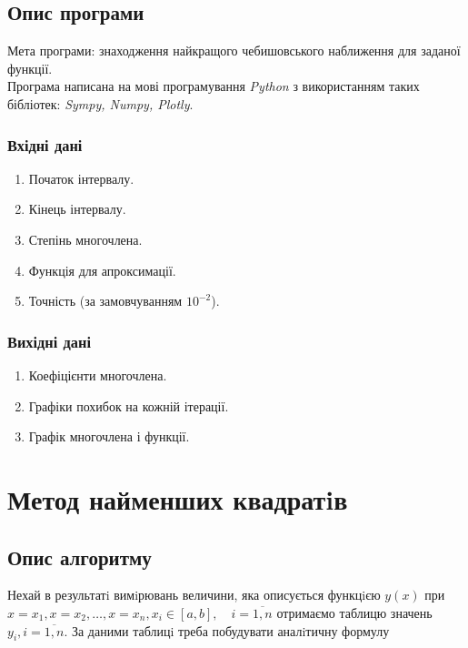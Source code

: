 \documentclass[ukrainian,14pt]{extarticle}
\begin{document}
\newpage

\subsection{Опис програми}

Мета програми: знаходження найкращого чебишовського наближення для заданої функції. \\
Програма написана на мові програмування \emph{Python} з використанням таких бібліотек: \emph{Sympy, Numpy, Plotly}.
\subsubsection{Вхідні дані}

\begin{enumerate}
\item Початок інтервалу.
\item Кінець інтервалу.
\item Степінь многочлена.
\item Функція для апроксимації.
\item Точність (за замовчуванням $10^{-2}$).
\end{enumerate}

\subsubsection{Вихідні дані}

\begin{enumerate}
\item Коефіцієнти многочлена.
\item Графіки похибок на кожній ітерації.
\item Графік многочлена і функції.

\end{enumerate}
\newpage

\section{Метод найменших квадратiв}
\subsection{Опис алгоритму}
Нехай в результатi вимiрювань величини, яка описується функцiєю
$y(x)$ при $x = x_1, x = x_2, \ldots , x = x_n, x_i \in [a, b], \quad i = \overline{1,n}$ отримаємо таблицю значень $y_i, i = \overline{1, n}$. За даними таблицi треба побудувати аналiтичну
формулу
\end{document}
